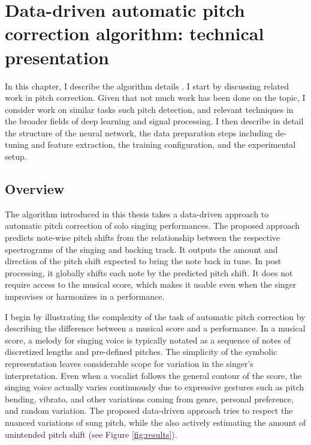 \chapter{Data-driven automatic pitch correction algorithm: technical presentation}
\label{chap:thesis-autotuner}
In this chapter, I describe the algorithm details \cite{wager2020deep}. I start by discussing related work in pitch correction. Given that not much work has been done on the topic, I consider work on similar tasks such pitch detection, and relevant techniques in the broader fields of deep learning and signal processing. I then describe in detail the structure of the neural network, the data preparation steps including de-tuning and feature extraction, the training configuration, and the experimental setup. 


\section{Overview}
The algorithm introduced in this thesis takes a data-driven approach to automatic pitch correction of solo singing performances. The proposed approach predicts note-wise pitch shifts from the relationship between the respective spectrograms of the singing and backing track. It outputs the amount and direction of the pitch shift expected to bring the note back in tune. In post processing, it globally shifts each note by the predicted pitch shift. It does not require access to the musical score, which makes it usable even when the singer improvises or harmonizes in a performance.

I begin by illustrating the complexity of the task of automatic pitch correction by describing the difference between a musical score and a performance. In a musical score, a melody for singing voice is typically notated as a sequence of notes of discretized lengths and pre-defined pitches. The simplicity of the symbolic representation leaves considerable scope for variation in the singer's interpretation. Even when a vocalist follows the general contour of the score, the singing voice actually varies continuously due to expressive gestures such as pitch bending, vibrato, and other variations coming from genre, personal preference, and random variation. The proposed data-driven approach tries to respect the nuanced variations of sung pitch, while the also actively estimating the amount of unintended pitch shift (see Figure \ref{fig:results}).

